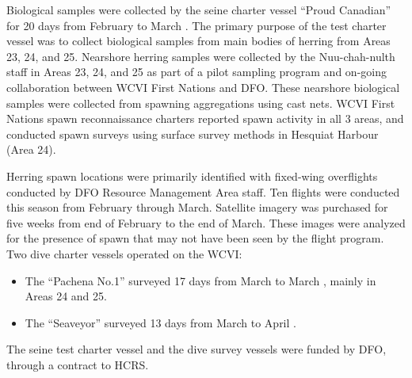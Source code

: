 Biological samples were collected by the seine charter vessel ``Proud Canadian'' for 20 days from February  to March .
The primary purpose of the test charter vessel was to collect biological samples from main bodies of herring from Areas 23, 24, and 25.
Nearshore herring samples were collected by the Nuu-chah-nulth staff in Areas 23, 24, and 25 as part of a pilot sampling program and on-going collaboration between WCVI First Nations and DFO.
These nearshore biological samples were collected from spawning aggregations using cast nets.
WCVI First Nations spawn reconnaissance charters reported spawn activity in all 3 areas, and conducted spawn surveys using surface survey methods in Hesquiat Harbour (Area 24).

Herring spawn locations were primarily identiﬁed with ﬁxed-wing overﬂights conducted by DFO Resource Management Area staff.
Ten ﬂights were conducted this season from February through March.
Satellite imagery was purchased for five weeks from end of February to the end of March.
These images were analyzed for the presence of spawn that may not have been seen by the flight program. 
Two dive charter vessels operated on the WCVI:
\begin{itemize}
\item The ``Pachena No.1'' surveyed 17 days from March  to March , mainly in Areas 24 and 25.
\item The ``Seaveyor'' surveyed 13 days from March  to April .
\end{itemize}
The seine test charter vessel and the dive survey vessels were funded by DFO, through a contract to HCRS.